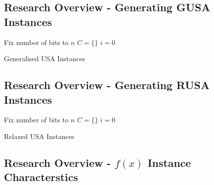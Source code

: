 \documentclass[
]{article}
\begin{document}
\hypertarget{research-overview---generating-gusa-instances}{%
\subsection{Research Overview - Generating GUSA
Instances}\label{research-overview---generating-gusa-instances}}

\begin{algorithm}[H]
\SetAlgoLined
 Fix number of bits to $n$\;
 $C=\{\}$\;
 $i=0$\;
 \caption{Generalised USA Instances}
 \label{alg:gusa}
\end{algorithm}

\hypertarget{research-overview---generating-rusa-instances}{%
\subsection{Research Overview - Generating RUSA
Instances}\label{research-overview---generating-rusa-instances}}

\begin{algorithm}[H]
\SetAlgoLined
 Fix number of bits to $n$\;
 $C=\{\}$\;
 $i=0$\;
 \caption{Relaxed USA Instances}
 \label{alg:rusa}
\end{algorithm}

\hypertarget{research-overview---fx-instance-characterstics}{%
\subsection{\texorpdfstring{Research Overview - \(f(x)\) Instance
Characterstics}{Research Overview - f(x) Instance Characterstics}}\label{research-overview---fx-instance-characterstics}}
\end{document}
